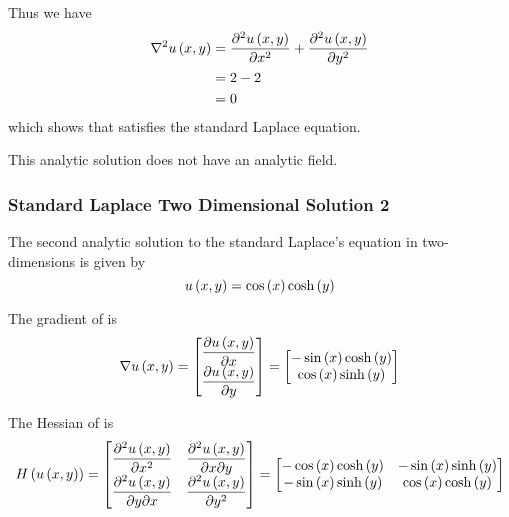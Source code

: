 Thus we have
\begin{equation}
  \begin{aligned}
    \laplacian{}{\fnof{u}{x,y}}&=\deltwosqby{\fnof{u}{x,y}}{x}+\deltwosqby{\fnof{u}{x,y}}{y}\\
    &=2-2\\
    &=0
  \end{aligned}
\end{equation}
which shows that  satisfies the standard Laplace equation.

This analytic solution does not have an analytic field.

\subsubsection{Standard Laplace Two Dimensional Solution 2}
 
The second analytic solution to the standard Laplace's equation in two-dimensions is given by
\begin{equation}
  \fnof{u}{x,y}=\cosine{x}\hypecosine{y}
  \label{eqn:StandardLaplaceTwoDAnalytic2}
\end{equation}

The gradient of  is
\begin{equation}
  \gradient{}{\fnof{u}{x,y}}=\begin{bmatrix}
  \delby{\fnof{u}{x,y}}{x} \\
  \delby{\fnof{u}{x,y}}{y}
  \end{bmatrix}=\begin{bmatrix}
  -\sine{x}\hypecosine{y} \\
  \cosine{x}\hypesine{y}
  \end{bmatrix}
  \label{eqn:StandardLaplaceTwoDAnalyticGradient2}
\end{equation}

The Hessian of  is
\begin{equation}
  \hessian{}{\fnof{u}{x,y}}=\begin{bmatrix}
  \deltwosqby{\fnof{u}{x,y}}{x} & \deltwoby{\fnof{u}{x,y}}{x}{y} \\
  \deltwoby{\fnof{u}{x,y}}{y}{x} & \deltwosqby{\fnof{u}{x,y}}{y}
  \end{bmatrix}=\begin{bmatrix}
  -\cosine{x}\hypecosine{y} & -\sine{x}\hypesine{y} \\
  -\sine{x}\hypesine{y} & \cosine{x}\hypecosine{y}
  \end{bmatrix}
  \label{eqn:StandardLaplaceTwoDAnalyticHessian2}
\end{equation}

